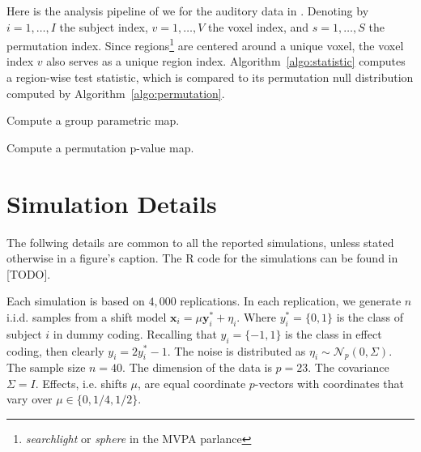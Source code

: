 \documentclass[12pt,a4paper]{article}
\newcommand{\set}[1]{\{ #1 \}} %
\newcommand{\rv}[1]{\mathbf{#1}} %
\newcommand{\x}{\rv x} %
\newcommand{\y}{\rv y} %
\newcommand{\gaussp}[2]{\mathcal{N}_{#1}\left(#2\right)} %
\begin{document}
Here is the analysis pipeline of \cite{stelzer_statistical_2013} we for the auditory data in \cite{gilron_quantifying_2016}.
Denoting by 
$i=1,\dots,I$ the subject index, 
$v=1,\dots,V$ the voxel index, and 
$s = 1,\dots,S$ the permutation index. 
Since regions\footnote{\emph{searchlight} or \emph{sphere} in the MVPA parlance} are centered around a unique voxel, the voxel index $v$ also serves as a unique region index.
Algorithm~\ref{algo:statistic} computes a region-wise test statistic, which is compared to its permutation null distribution computed by Algorithm~\ref{algo:permutation}.


\begin{algorithm}[H]
\caption{Compute a group parametric map.}
\label{algo:statistic}

\end{algorithm}


\begin{algorithm}[H]
\caption{Compute a permutation p-value map.} 
\label{algo:permutation}

\end{algorithm}

\newpage


\section{Simulation Details}
\label{apx:simulation_details}

The follwing details are common to all the reported simulations, unless stated otherwise in a figure's caption. 
The \textsf{R} code for the simulations can be found in [TODO].

Each simulation is based on $4,000$ replications. 
In each replication, we generate $n$ i.i.d. samples from a shift model $\x_i = \mu \y^*_i + \eta_i$.
Where $y^*_i=\set{0,1}$ is the class of subject $i$ in dummy coding. 
Recalling that $y_i=\set{-1,1}$ is the class in effect coding, then clearly $y_i=2 y^*_i-1$.
The noise is distributed as $\eta_i \sim \gaussp{p}{0,\Sigma}$. 
The sample size $n=40$. 
The dimension of the data is $p=23$. 
The covariance $\Sigma=I$. 
Effects, i.e. shifts $\mu$, are equal coordinate $p$-vectors with coordinates that vary over $\mu \in \set{0,1/4,1/2}$.
\end{document}
